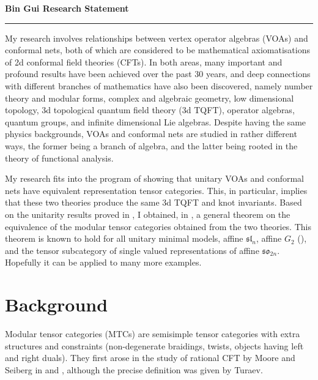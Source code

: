 \documentclass[10pt]{amsart}
\theoremstyle{definition}
\theoremstyle{plain}
\newcommand{\makeheading}[1]%
	{\hspace*{-\marginparsep minus \marginparwidth}%
		\begin{minipage}[t]{\textwidth}%
			{\large \bfseries #1}\\[-0.15\baselineskip]%
			\rule{\columnwidth}{1pt}%
		\end{minipage}}
\begin{document}
\sloppy
\makeheading{Bin Gui \hfill Research Statement}
\vspace{5mm}

My research involves relationships between vertex operator algebras (VOAs)  and conformal nets, both of which are considered to be mathematical axiomatisations of  2d conformal field theories (CFTs). In both areas, many important and profound results have been achieved over the past 30 years, and deep connections with different branches of mathematics have also been discovered, namely number theory and modular forms, complex and algebraic geometry, low dimensional topology, 3d topological quantum field theory (3d TQFT), operator algebras, quantum groups, and infinite dimensional Lie algebras. Despite having the same physics backgrounds,  VOAs and conformal nets are studied  in rather different ways, the former being a branch of algebra, and the latter being rooted in the theory of functional analysis. 

My research fits into the  program of showing that unitary VOAs and conformal nets have equivalent representation tensor categories. This, in particular, implies that these two theories produce the same 3d TQFT and knot invariants. Based on the unitarity results proved in \cite{G unitary1,G unitary2}, I obtained, in \cite{G equivalence}, a general theorem on the equivalence of the modular tensor categories obtained from the two theories. This theorem is known to hold for all unitary minimal models, affine $\mathfrak {sl}_n$, affine $G_2$ (\cite{G G2}), and the tensor subcategory of  single valued representations of affine $\mathfrak {so}_{2n}$. Hopefully it can be applied to many more examples.



\section{Background}

Modular tensor categories (MTCs) are  semisimple tensor categories with  extra structures and constraints  (non-degenerate braidings,  twists, objects having left and right duals). They first arose in the study of rational CFT by Moore and Seiberg in \cite{MS poly} and \cite{MS CQ},  although the precise definition  was given by Turaev. 
\end{document}
